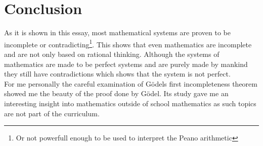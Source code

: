 \documentclass[english,12pt]{article}
\begin{document}
\section{Conclusion}
As it is shown in this essay, most mathematical systems are proven to be incomplete or contradicting\footnote{Or not powerfull enough to be used to interpret the Peano arithmetic}. This shows that even mathematics are incomplete and are not only based on rational thinking. Although the systems of mathematics are made to be perfect systems and are purely made by mankind they still have contradictions which shows that the system is not perfect.\\
For me personally the careful examination of Gödels first incompleteness theorem showed me the beauty of the proof done by Gödel. Its study gave me an interesting insight into mathematics outside of school mathematics as such topics are not part of the curriculum.
\nocite{*}
\medskip
 


\end{document}

